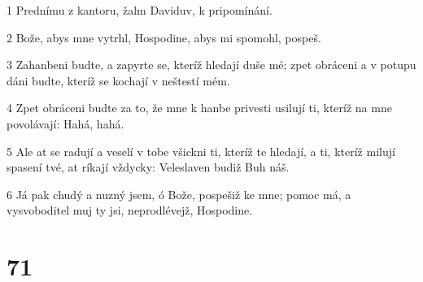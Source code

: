 \par 1 Prednímu z kantoru, žalm Daviduv, k pripomínání.
\par 2 Bože, abys mne vytrhl, Hospodine, abys mi spomohl, pospeš.
\par 3 Zahanbeni budte, a zapyrte se, kteríž hledají duše mé; zpet obráceni a v potupu dáni budte, kteríž se kochají v neštestí mém.
\par 4 Zpet obráceni budte za to, že mne k hanbe privesti usilují ti, kteríž na mne povolávají: Hahá, hahá.
\par 5 Ale at se radují a veselí v tobe všickni ti, kteríž te hledají, a ti, kteríž milují spasení tvé, at ríkají vždycky: Veleslaven budiž Buh náš.
\par 6 Já pak chudý a nuzný jsem, ó Bože, pospešiž ke mne; pomoc má, a vysvoboditel muj ty jsi, neprodlévejž, Hospodine.

\chapter{71}

